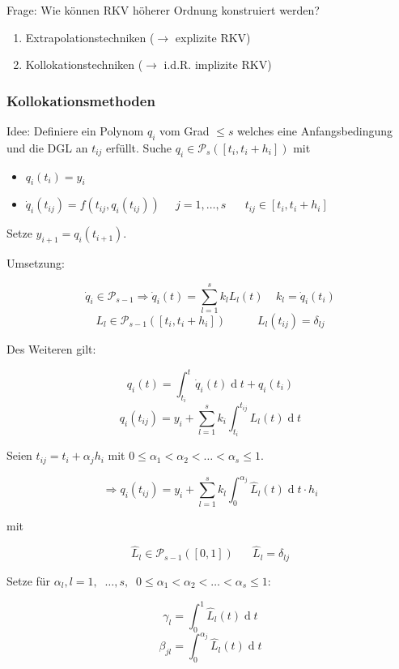 Frage: Wie können RKV höherer Ordnung konstruiert werden?
\begin{enumerate}
	\item Extrapolationstechniken ($\rightarrow$ explizite RKV)
	\item Kollokationstechniken ($\rightarrow$ i.d.R. implizite RKV)
\end{enumerate}

\subsubsection{Kollokationsmethoden}

Idee: Definiere ein Polynom $q_i$ vom Grad $\le s$ welches eine Anfangsbedingung und die DGL an $t_{ij}$ erfüllt. Suche $q_i \in \mathcal{P}_s([t_i, t_i + h_i])$ mit

\begin{itemize}
	\item $q_i(t_i) = y_i$
	\item $\dot{q}_i(t_{ij}) = f(t_{ij}, q_i(t_{ij}))\;\;\;\;\;j=1,\ldots,s\;\;\;\;\;\;t_{ij} \in [t_i, t_i + h_i]$
\end{itemize}

Setze $y_{i+1} = q_i(t_{i+1})$.

Umsetzung: 

$$\dot{q}_i \in \mathcal{P}_{s-1} \Rightarrow \dot{q}_i(t) = \sum_{l=1}^s k_l L_l(t)\;\;\;\;k_l = \dot{q}_i(t_i)$$
$$L_l \in \mathcal{P}_{s-1}\left(\left[t_i, t_i + h_i\right]\right)\;\;\;\;\;\;\;\;\;\;L_l(t_{ij}) = \delta_{lj}$$

Des Weiteren gilt:

$$q_i(t) = \int_{t_i}^t\!\dot{q}_i(t) \operatorname{d}t + q_i(t_i)$$
$$q_i(t_{ij}) = y_i + \sum_{l=1}^s k_i \int_{t_i}^{t_{ij}}\! L_l(t) \operatorname{d}t$$

Seien $t_{ij} = t_i + \alpha_j h_i$ mit $0 \le \alpha_1 < \alpha_2 < \dots < \alpha_s \le 1$.

$$\Rightarrow q_i(t_{ij}) = y_i + \sum_{l=1}^s k_l \int_{0}^{\alpha_j}\! \hat{L}_l(t) \operatorname{d}t \cdot h_i$$

mit 

$$\hat{L}_l \in \mathcal{P}_{s-1}([0,1])\;\;\;\;\;\;\hat{L}_l = \delta_{lj}$$

Setze für $\alpha_l, l = 1,\;\; \dots, s,\;\; 0 \le \alpha_1 < \alpha_2 < \dots < \alpha_s \le 1$:

$$\gamma_l = \int_0^1\!\hat{L}_l(t)\operatorname{d}t$$
$$\beta_{jl} = \int_0^{\alpha_j}\!\hat{L}_l(t)\operatorname{d}t$$

